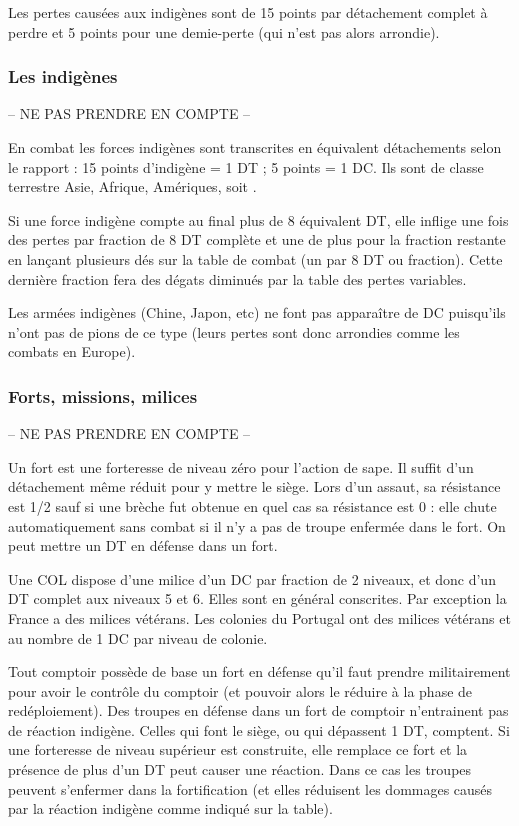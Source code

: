 Les pertes causées aux indigènes sont de 15 points par détachement complet 
à perdre et 5 points  pour une demie-perte (qui n'est pas alors arrondie).


\subsubsection{Les indigènes}
-- NE PAS PRENDRE EN COMPTE --

En combat les forces indigènes sont transcrites en équivalent détachements selon
le rapport : 15 points d'indigène = 1 DT ; 5 points = 1 DC. 
Ils sont de classe terrestre Asie, Afrique, Amériques, soit \CAA.

Si une force indigène compte au final plus de 8 équivalent DT, elle inflige une fois
des pertes par fraction de 8 DT complète et une de plus pour la fraction restante
en lançant plusieurs dés sur la table de combat (un par 8 DT ou fraction).
Cette dernière fraction fera des dégats diminués par la table des pertes variables.

Les armées indigènes (Chine, Japon, etc) ne font pas apparaître de DC 
puisqu'ils n'ont pas de pions de ce type (leurs pertes sont donc arrondies 
comme les combats en Europe).

\subsubsection{Forts, missions, milices}
-- NE PAS PRENDRE EN COMPTE --

Un fort est une forteresse de niveau zéro pour l'action de sape.
Il suffit d'un détachement même réduit pour y mettre le siège.
Lors d'un assaut, sa résistance est 1/2 sauf si une brèche fut obtenue en
quel cas sa résistance est 0 : elle chute automatiquement sans combat
si il n'y a pas de troupe enfermée dans le fort. On peut mettre
un DT en défense dans un fort.

Une COL dispose d'une milice d'un DC par fraction de 2 niveaux, et donc 
d'un DT complet aux niveaux 5 et 6. Elles sont en général conscrites. Par 
exception la France a des milices vétérans. Les colonies du Portugal ont 
des milices vétérans et au nombre de 1 DC par niveau de colonie.

Tout comptoir possède de base un fort en défense qu'il faut prendre
militairement pour avoir le contrôle du comptoir (et pouvoir
alors le réduire à la phase de redéploiement). 
Des troupes en défense dans un fort de comptoir
n'entrainent pas de réaction indigène. Celles qui font le siège,
ou qui dépassent 1 DT, comptent. Si une forteresse de niveau supérieur est
construite, elle remplace ce fort et la présence de plus d'un DT peut
causer une réaction. Dans ce cas les troupes peuvent
s'enfermer dans la fortification (et elles réduisent les dommages
causés par la réaction indigène comme indiqué sur la
table).

